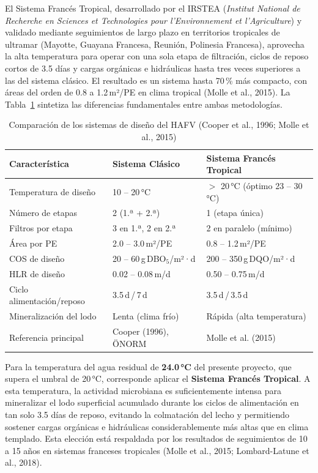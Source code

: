 \documentclass[12pt,a4paper]{article}
\begin{document}
El Sistema Francés Tropical, desarrollado por el IRSTEA (\textit{Institut National de Recherche en Sciences et Technologies pour l'Environnement et l'Agriculture}) y validado mediante seguimientos de largo plazo en territorios tropicales de ultramar (Mayotte, Guayana Francesa, Reunión, Polinesia Francesa), aprovecha la alta temperatura para operar con una sola etapa de filtración, ciclos de reposo cortos de 3.5 días y cargas orgánicas e hidráulicas hasta tres veces superiores a las del sistema clásico. El resultado es un sistema hasta 70\,\% más compacto, con áreas del orden de 0.8 a 1.2\,m²/PE en clima tropical (Molle et al., 2015). La Tabla~\ref{tab:comparacion_sistemas} sintetiza las diferencias fundamentales entre ambas metodologías.

\begin{table}[H]
\centering
\caption{Comparación de los sistemas de diseño del HAFV (Cooper et al., 1996; Molle et al., 2015)}
\label{tab:comparacion_sistemas}
\begin{tabular}{p{4.8cm}p{4.2cm}p{4.2cm}}
\toprule
\textbf{Característica} & \textbf{Sistema Clásico} & \textbf{Sistema Francés Tropical} \\
\midrule
Temperatura de diseño & 10 -- 20\,°C & $>$ 20\,°C (óptimo 23 -- 30\,°C) \\
Número de etapas & 2 (1.ª + 2.ª) & 1 (etapa única) \\
Filtros por etapa & 3 en 1.ª, 2 en 2.ª & 2 en paralelo (mínimo) \\
Área por PE & 2.0 -- 3.0\,m²/PE & 0.8 -- 1.2\,m²/PE \\
COS de diseño & 20 -- 60\,g\,DBO$_5$/m²·d & 200 -- 350\,g\,DQO/m²·d \\
HLR de diseño & 0.02 -- 0.08\,m/d & 0.50 -- 0.75\,m/d \\
Ciclo alimentación/reposo & 3.5\,d\,/\,7\,d & 3.5\,d\,/\,3.5\,d \\
Mineralización del lodo & Lenta (clima frío) & Rápida (alta temperatura) \\
Referencia principal & Cooper (1996), ÖNORM & Molle et al. (2015) \\
\bottomrule
\end{tabular}
\end{table}

Para la temperatura del agua residual de \textbf{24.0\,°C} del presente proyecto, que supera el umbral de 20\,°C, corresponde aplicar el \textbf{Sistema Francés Tropical}. A esta temperatura, la actividad microbiana es suficientemente intensa para mineralizar el lodo superficial acumulado durante los ciclos de alimentación en tan solo 3.5 días de reposo, evitando la colmatación del lecho y permitiendo sostener cargas orgánicas e hidráulicas considerablemente más altas que en clima templado. Esta elección está respaldada por los resultados de seguimientos de 10 a 15 años en sistemas franceses tropicales (Molle et al., 2015; Lombard-Latune et al., 2018).
\end{document}
